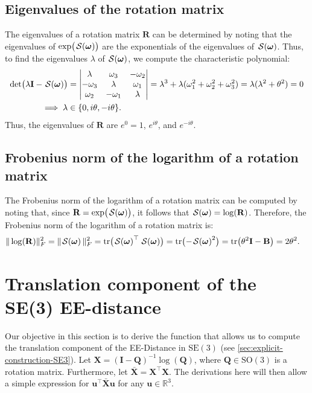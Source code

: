\subsection{Eigenvalues of the rotation matrix}
The eigenvalues of a rotation matrix $\mathbf{R}$ can be determined by noting that the eigenvalues of $\exp\bigl(\SL[\boldsymbol{\omega}]\bigr)$ are the exponentials of the eigenvalues of $\SL[\boldsymbol{\omega}]$. Thus, to find the eigenvalues $\lambda$ of $\SL[\boldsymbol{\omega}]$, we compute the characteristic polynomial:
\begin{align}
    \det\bigl(\lambda\mathbf{I} - \SL[\boldsymbol{\omega}]\bigr)&=\begin{vmatrix}
        \lambda & \omega_3 & -\omega_2\\
        -\omega_3 & \lambda & \omega_1\\
        \omega_2 & -\omega_1 & \lambda
    \end{vmatrix} = \lambda^3 + \lambda(\omega_1^2 + \omega_2^2 + \omega_3^2) = \lambda(\lambda^2 + \theta^2)=0\\
    \implies \lambda&\in\{0, i\theta, -i\theta\}.
\end{align}
Thus, the eigenvalues of $\mathbf{R}$ are $e^0=1$, $e^{i\theta}$, and $e^{-i\theta}$.

\subsection{Frobenius norm of the logarithm of a rotation matrix}
The Frobenius norm of the logarithm of a rotation matrix can be computed by noting that, since $\mathbf{R} = \exp\bigl(\SL[\boldsymbol{\omega}]\bigr)$, it follows that $\SL[\boldsymbol{\omega}] = \log(\mathbf{R})$. Therefore, the Frobenius norm of the logarithm of a rotation matrix is:
\begin{align}
    \|\log(\mathbf{R})\|_F^2=\|\SL[\boldsymbol{\omega}]\|_F^2 &= \tr\bigl(\SL[\boldsymbol{\omega}]^\top\SL[\boldsymbol{\omega}]\bigr) = \tr\bigl(-\SL[\boldsymbol{\omega}]^2\bigr) = \tr\bigl(\theta^2\mathbf{I} - \mathbf{B}\bigr) = 2\theta^2.
\end{align}

\section{Translation component of the SE(3) EE-distance}\label{app:translation-component-SE3}
Our objective in this section is to derive the function that allows us to compute the translation component of the EE-Distance in $\text{SE}(3)$ (see \cref{sec:explicit-construction-SE3}). Let $\mathbf{X}=(\mathbf{I} - \mathbf{Q})^{-1}\log(\mathbf{Q})$, where $\mathbf{Q}\in\text{SO}(3)$ is a rotation matrix. Furthermore, let $\bar{\mathbf{X}}=\mathbf{X}^\top\mathbf{X}$. The derivations here will then allow a simple expression for $\mathbf{u}^\top\bar{\mathbf{X}}\mathbf{u}$ for any $\mathbf{u}\in\mathbb{R}^3$.

